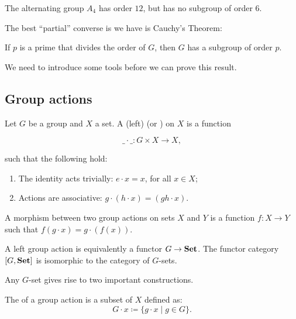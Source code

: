 \begin{example}
  The alternating group \(A_{4}\) has order \(12\), but has no subgroup of order 6.
\end{example}

The best ``partial'' converse is we have is Cauchy's Theorem:

\begin{theorem}\label{thm:group-theory:cauchys-theorem}
  If \(p\) is a prime that divides the order of \(G\), then \(G\) has a subgroup of order \(p\).
\end{theorem}

We need to introduce some tools before we can prove this result.

\subsection{Group actions}

\begin{definition}\label{def:group-theory:group-action}
  Let \(G\) be a group and \(X\) a set. A (left)  (or ) on \(X\) is a function

  \[\_ \cdot \_ :  G \times X \to X,\]

  such that the following hold:

  \begin{enumerate}
    \item The identity acts trivially: \(e \cdot x = x\), for all \(x \in X\);
    \item Actions are associative: \(g \cdot (h \cdot x) = (gh \cdot x)\).
  \end{enumerate}

  A morphism between two group actions on sets \(X\) and \(Y\) is a function \(f: X \to Y\) such that \(f(g\cdot x) = g \cdot (f(x))\).
\end{definition}

\begin{categorybox}
  A left group action is equivalently a functor \(G \to \mathbf{Set}\). The functor category \([G, \mathbf{Set}]\) is isomorphic to the category of \(G\)-sets.
\end{categorybox}

Any \(G\)-set gives rise to two important constructions.

\begin{definition}\label{def:group-theory:orbit}
  The  of a group action is a subset of \(X\) defined as:
  \[G \cdot x \coloneqq \{g \cdot x \mid g \in G\}.\]
\end{definition}

